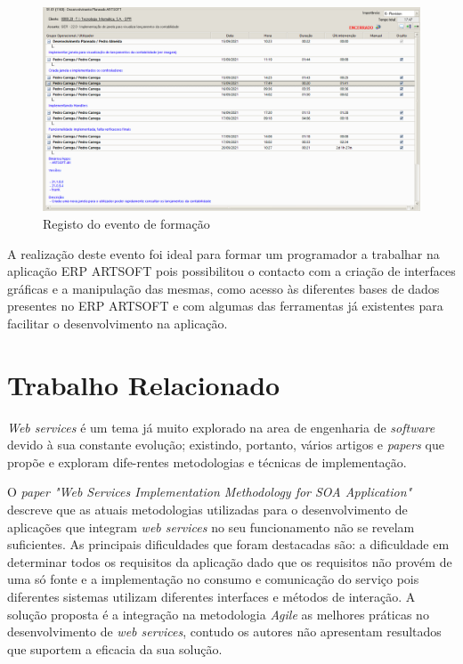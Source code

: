 \documentclass[sigplan]{acmart}
\begin{document}
\FloatBarrier
\begin{figure}[htbp]
	\centerline{\includegraphics[width=\linewidth]{figures/evento_formacao.png}}
	\caption{Registo do evento de formação}
	\label{fig2}
\end{figure}
\FloatBarrier
A realização deste evento foi ideal para formar um programador a trabalhar na aplicação ERP ARTSOFT pois possibilitou o contacto com a criação de interfaces gráficas e a manipulação das mesmas, como acesso às diferentes bases de dados presentes no ERP ARTSOFT e com algumas das ferramentas já existentes para facilitar o desenvolvimento na aplicação.
\section{Trabalho Relacionado} \label{sec:relatedwork}


\textit{Web services} é um tema já muito explorado na area de engenharia de \textit{software} devido à sua constante evolução; existindo, portanto, vários artigos e \textit{papers} que propõe e exploram dife-rentes metodologias e técnicas de implementação.



O \textit{paper "Web Services Implementation Methodology for SOA Application"}\cite{SOAA} descreve que as atuais metodologias utilizadas para o desenvolvimento de aplicações que integram \textit{web services} no seu funcionamento não se revelam suficientes. As principais dificuldades que foram destacadas são: a dificuldade em determinar todos os requisitos da aplicação dado que os requisitos não provém de uma só fonte e a implementação no consumo e comunicação do serviço pois diferentes sistemas utilizam diferentes interfaces e métodos de interação. A solução proposta é a integração na metodologia \textit{Agile} as melhores práticas no desenvolvimento de \textit{web services}, contudo os autores não apresentam resultados que suportem a eficacia da sua solução.
\end{document}
